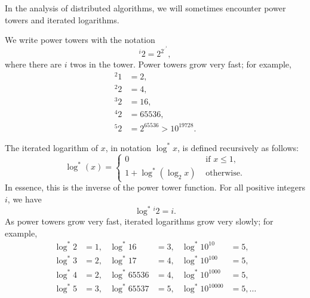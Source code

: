 
In the analysis of distributed algorithms, we will sometimes encounter power towers and iterated logarithms.



We write power towers with the notation
\[
    {}^i 2 = 2^{2^{\cdot^{\cdot^2}}},
\]
where there are $i$ twos in the tower. Power towers grow very fast; for example,
\begin{align*}
    {}^2 1 &= 2,\\
    {}^2 2 &= 4,\\
    {}^3 2 &= 16,\\
    {}^4 2 &= 65536,\\
    {}^5 2 &= 2^{65536} > 10^{19728}.
\end{align*}



The iterated logarithm of $x$, in notation $\log^* x$, is defined recursively as follows:
\[
    \log^*(x) = \begin{cases}
        0 & \text{ if $x \le 1$}, \\
        1 + \log^*(\log_2 x) & \text{ otherwise}.
    \end{cases}
\]
In essence, this is the inverse of the power tower function. For all positive integers $i$, we have
\[
    \log^* {}^i 2 = i.
\]
As power towers grow very fast, iterated logarithms grow very slowly; for example,
\begin{align*}
    \log^* 2 &= 1, &
    \log^* 16 &= 3, &
    \log^* 10^{10} &= 5, \\
    \log^* 3 &= 2, &
    \log^* 17 &= 4, &
    \log^* 10^{100} &= 5, \\
    \log^* 4 &= 2, &
    \log^* 65536 &= 4, &
    \log^* 10^{1000} &= 5, \\
    \log^* 5 &= 3, &
    \log^* 65537 &= 5, &
    \log^* 10^{10000} &= 5, \dotsc
\end{align*}

